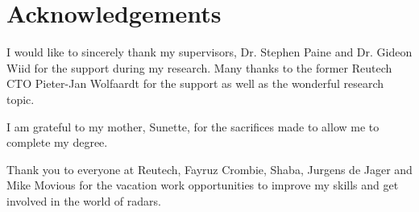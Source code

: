 %
%

\chapter*{Acknowledgements}
\vspace{0.3cm}

I would like to sincerely thank my supervisors, Dr. Stephen Paine and Dr. Gideon Wiid for the support during my research. Many thanks to the former Reutech CTO Pieter-Jan Wolfaardt for the support as well as the wonderful research topic.

I am grateful to my mother, Sunette, for the sacrifices made to allow me to complete my degree.

Thank you to everyone at Reutech, Fayruz Crombie, Shaba, Jurgens de Jager and Mike Movious for the vacation work opportunities to improve my skills and get involved in the world of radars. 



%